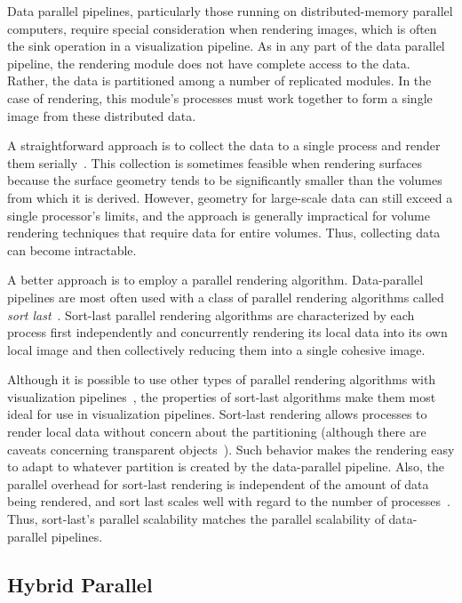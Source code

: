 \documentclass[journal,twocolumn,10pt,letterpaper,twoside]{IEEEtran}
\newcommand*{\lcite}[1]{~\cite{#1}}
\newcommand*{\keyterm}[1]{\emph{#1}}
\begin{document}
Data parallel pipelines, particularly those running on distributed-memory
parallel computers, require special consideration when rendering images,
which is often the sink operation in a visualization pipeline.  As in any
part of the data parallel pipeline, the rendering module does not have
complete access to the data.  Rather, the data is partitioned among a
number of replicated modules.  In the case of rendering, this
module's processes must work together to form a single image from these
distributed data.

A straightforward approach is to collect the data to a single process and
render them serially\lcite{Miller1998,Johnson1999}.  This collection is
sometimes feasible when rendering surfaces because the surface geometry
tends to be significantly smaller than the volumes from which it is
derived.  However, geometry for large-scale data can still exceed a single
processor's limits, and the approach is generally impractical for volume
rendering techniques that require data for entire volumes.  Thus,
collecting data can become intractable.

A better approach is to employ a parallel rendering algorithm.
Data-parallel pipelines are most often used with a class of parallel
rendering algorithms called \keyterm{sort last}\lcite{Molnar1994}.
Sort-last parallel rendering algorithms are characterized by each process
first independently and concurrently rendering its local data into its own
local image and then collectively reducing them
into a single cohesive image.

Although it is possible to use other types of parallel rendering algorithms
with visualization pipelines\lcite{Moreland2003}, the properties of
sort-last algorithms make them most ideal for use in visualization
pipelines.  Sort-last rendering allows processes to render local data
without concern about the partitioning (although there are caveats
concerning transparent objects\lcite{Moreland2007}).  Such behavior makes
the rendering easy to adapt to whatever partition is created by the
data-parallel pipeline.  Also, the parallel overhead for sort-last
rendering is independent of the amount of data being rendered, and sort
last scales well with regard to the number of processes\lcite{Wylie2001}.
Thus, sort-last's parallel scalability matches the parallel scalability of
data-parallel pipelines.

\subsection{Hybrid Parallel}
\label{sec:HybridParallel}
\end{document}

